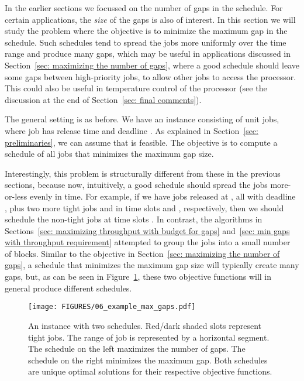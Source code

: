 





In the earlier sections we focussed on the number of gaps in the schedule. For
certain applications,  the \emph{size} of the gaps is also of interest. 
In this section we will study the problem where the objective is to
minimize the maximum gap in the schedule. Such schedules
tend to spread the jobs more uniformly over the time range and
produce many gaps, which may be useful in applications
discussed in Section~\ref{sec: maximizing the number of gaps}, where a good
schedule should leave some gaps between high-priority jobs, to allow other
jobs to access the processor. This could also be useful in temperature
control of the processor (see the discussion at the end of Section~\ref{sec: final comments}).

The general setting is as before. We have an instance  consisting
of  unit jobs, where job  has release time  and deadline . 
As explained in Section~\ref{sec: preliminaries}, we can assume that  is feasible.
The objective is to compute a schedule of all jobs that minimizes the maximum gap size.

Interestingly, this problem is structurally different from these in the previous 
sections, because now, intuitively, a good schedule should
spread the jobs more-or-less evenly in time. For example, if we have  jobs released 
at , all with deadline , plus two more tight jobs  and  in time slots  and , respectively,
then we should schedule the non-tight jobs 
at time slots . In contrast, the algorithms in
Sections~\ref{sec: maximizing throughput with budget for gaps} and~\ref{sec: min gaps with throughput requirement}
attempted to group the jobs into a small number of blocks. 
Similar to the objective in Section~\ref{sec: maximizing the number of gaps}, a schedule
that minimizes the maximum gap size will typically create many gaps, but,
as can be seen in Figure~\ref{fig: example max gaps}, these two objective functions
will in general produce different schedules.



\begin{figure}[ht]
\begin{center}
\texttt{[image: FIGURES/06\_example\_max\_gaps.pdf]}
\caption{An instance with two schedules. Red/dark shaded slots represent tight jobs.
The range of job  is represented by a horizontal segment. The schedule on the left maximizes the
number of gaps. The schedule on the right minimizes the maximum gap. Both
schedules are unique optimal solutions for their respective objective functions.}
\label{fig: example max gaps}
\end{center}
\end{figure}



